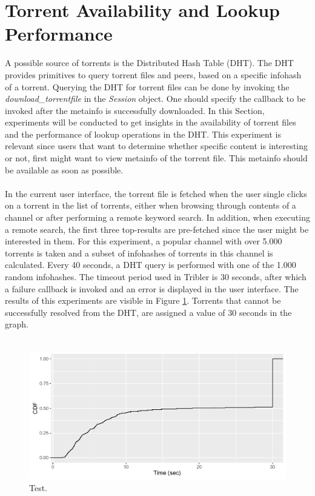 \section{Torrent Availability and Lookup Performance}
A possible source of torrents is the Distributed Hash Table (DHT). The DHT provides primitives to query torrent files and peers, based on a specific infohash of a torrent. Querying the DHT for torrent files can be done by invoking the \emph{download\_torrentfile} in the \emph{Session} object. One should specify the callback to be invoked after the metainfo is successfully downloaded. In this Section, experiments will be conducted to get insights in the availability of torrent files and the performance of lookup operations in the DHT. This experiment is relevant since users that want to determine whether specific content is interesting or not, first might want to view metainfo of the torrent file. This metainfo should be available as soon as possible.\\\\
In the current user interface, the torrent file is fetched when the user single clicks on a torrent in the list of torrents, either when browsing through contents of a channel or after performing a remote keyword search. In addition, when executing a remote search, the first three top-results are pre-fetched since the user might be interested in them. For this experiment, a popular channel with over 5.000 torrents is taken and a subset of infohashes of torrents in this channel is calculated. Every 40 seconds, a DHT query is performed with one of the 1.000 random infohashes. The timeout period used in Tribler is 30 seconds, after which a failure callback is invoked and an error is displayed in the user interface. The results of this experiments are visible in Figure \ref{fig:metainfo_fetch}. Torrents that cannot be successfully resolved from the DHT, are assigned a value of 30 seconds in the graph.\\\\

\begin{figure}[!h]
	\centering
	\includegraphics[width=0.9\columnwidth]{images/experiments/metainfo_fetch}
	\caption{Test.}
	\label{fig:metainfo_fetch}
\end{figure}

